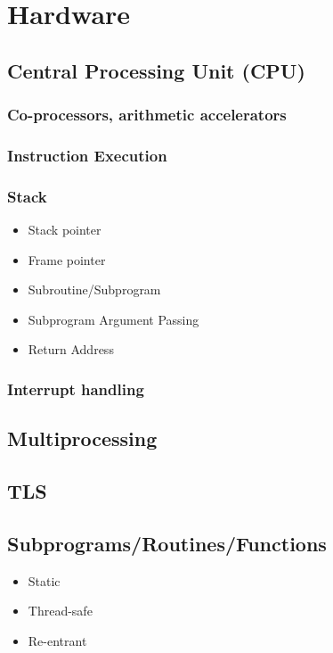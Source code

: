 \documentclass[12pt,a4paper]{article}
\begin{document}
\section{Hardware}

\subsection{Central Processing Unit (CPU)}

\subsubsection{Co-processors, arithmetic accelerators}

\subsubsection{Instruction Execution}

\subsubsection{Stack}

\begin{itemize}
\item Stack pointer
\item Frame pointer
\item Subroutine/Subprogram
\item Subprogram Argument Passing
\item Return Address
\end{itemize}

\subsubsection{Interrupt handling}

\subsection{Multiprocessing}

\subsection{TLS}

\subsection{Subprograms/Routines/Functions}

\begin{itemize}
\item Static
\item Thread-safe
\item Re-entrant
\end{itemize}
\end{document}
